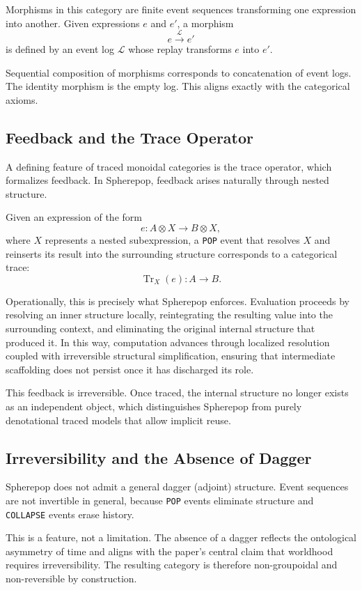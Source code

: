 \documentclass[11pt]{article}
\begin{document}
Morphisms in this category are finite event sequences transforming one expression into another. Given expressions $e$ and $e'$, a morphism
\[
e \xrightarrow{\;\mathcal{L}\;} e'
\]
is defined by an event log $\mathcal{L}$ whose replay transforms $e$ into $e'$.

Sequential composition of morphisms corresponds to concatenation of event logs. The identity morphism is the empty log. This aligns exactly with the categorical axioms.

\subsection{Feedback and the Trace Operator}

A defining feature of traced monoidal categories is the trace operator, which formalizes feedback. In Spherepop, feedback arises naturally through nested structure.

Given an expression of the form
\[
e : A \otimes X \to B \otimes X,
\]
where $X$ represents a nested subexpression, a \texttt{POP} event that resolves $X$ and reinserts its result into the surrounding structure corresponds to a categorical trace:
\[
\operatorname{Tr}_X(e) : A \to B.
\]

Operationally, this is precisely what Spherepop enforces. Evaluation proceeds by resolving an inner structure locally, reintegrating the resulting value into the surrounding context, and eliminating the original internal structure that produced it. In this way, computation advances through localized resolution coupled with irreversible structural simplification, ensuring that intermediate scaffolding does not persist once it has discharged its role.

This feedback is irreversible. Once traced, the internal structure no longer exists as an independent object, which distinguishes Spherepop from purely denotational traced models that allow implicit reuse.

\subsection{Irreversibility and the Absence of Dagger}

Spherepop does not admit a general dagger (adjoint) structure. Event sequences are not invertible in general, because \texttt{POP} events eliminate structure and \texttt{COLLAPSE} events erase history.

This is a feature, not a limitation. The absence of a dagger reflects the ontological asymmetry of time and aligns with the paper’s central claim that worldhood requires irreversibility. The resulting category is therefore non-groupoidal and non-reversible by construction.
\end{document}
